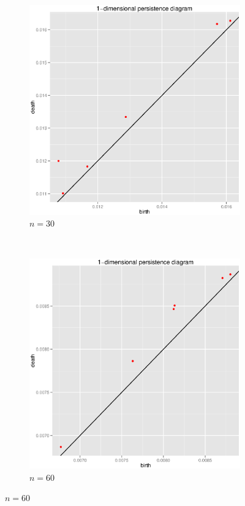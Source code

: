 \documentclass{article}
\begin{document}
\begin{figure}
\centering
\begin{subfigure}[htbp]{0.45 \textwidth}
\includegraphics[width = \linewidth]{psqplots/p2-1-90}
\caption{$n = 30$}
\label{p2-1-30}
\end{subfigure}
~
\begin{subfigure}[htbp]{0.45 \textwidth}
\includegraphics[width = \linewidth]{psqplots/p2-1-60}
\caption{$n = 60$}
\label{p2-1-60}
\end{subfigure}


\end{figure}
\end{document}
